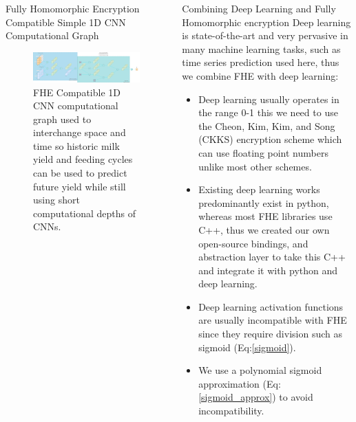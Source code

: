 \documentclass{beamer}
\begin{document}
\begin{frame}
    \begin{columns}
      \begin{column}{0.6\textwidth}
        \begin{block}{Fully Homomorphic Encryption Compatible Simple 1D CNN Computational Graph}
          \begin{figure}
            \centering
            \includegraphics[width=\textwidth]{encrypted_cnn.png}
            \caption{FHE Compatible 1D CNN computational graph used to interchange space and time so historic milk yield and feeding cycles can be used to predict future yield while still using short computational depths of CNNs.}
            \label{fig:computational_graph}
          \end{figure}
        \end{block}
      \end{column}
      \begin{column}{0.35\textwidth}
        \begin{block}{Combining Deep Learning and Fully Homomorphic encryption}
          Deep learning is state-of-the-art and very pervasive in many machine learning tasks, such as time series prediction used here, thus we combine FHE with deep learning:
          \begin{itemize}
              \item Deep learning usually operates in the range 0-1 this we need to use the Cheon, Kim, Kim, and Song (CKKS) \autocite{ckks} encryption scheme which can use floating point numbers unlike most other schemes.
              \item Existing deep learning works predominantly exist in python, whereas most FHE libraries use C++, thus we created our own open-source bindings, and abstraction layer to take this C++ and integrate it with python and deep learning.
              \item Deep learning activation functions are usually incompatible with FHE since they require division such as sigmoid (Eq:\ref{sigmoid}).
              \item We use a polynomial sigmoid approximation (Eq:\ref{sigmoid_approx}) to avoid incompatibility.

\end{itemize}
\end{block}
\end{column}
\end{columns}
\end{frame}
\end{document}

